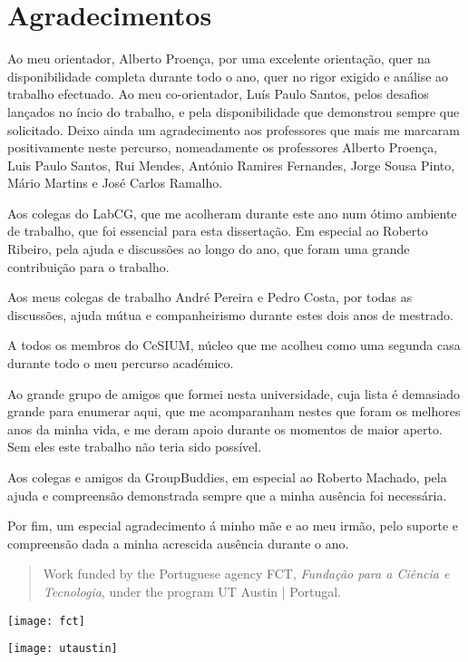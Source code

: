 \documentclass[main.tex]{subfiles}
\begin{document}
\chapter*{Agradecimentos}

Ao meu orientador, Alberto Proença, por uma excelente orientação, quer na disponibilidade completa durante todo o ano, quer no rigor exigido e análise ao trabalho efectuado. Ao meu co-orientador, Luís Paulo Santos, pelos desafios lançados no íncio do trabalho, e pela disponibilidade que demonstrou sempre que solicitado. Deixo ainda um agradecimento aos professores que mais me marcaram positivamente neste percurso, nomeadamente os professores Alberto Proença, Luis Paulo Santos, Rui Mendes, António Ramires Fernandes, Jorge Sousa Pinto, Mário Martins e José Carlos Ramalho.

Aos colegas do LabCG, que me acolheram durante este ano num ótimo ambiente de trabalho, que foi essencial para esta dissertação. Em especial ao Roberto Ribeiro, pela ajuda e discussões ao longo do ano, que foram uma grande contribuição para o trabalho.

Aos meus colegas de trabalho André Pereira e Pedro Costa, por todas as discussões, ajuda mútua e companheirismo durante estes dois anos de mestrado.

A todos os membros do CeSIUM, núcleo que me acolheu como uma segunda casa durante todo o meu percurso académico.

Ao grande grupo de amigos que formei nesta universidade, cuja lista é demasiado grande para enumerar aqui, que me acomparanham nestes que foram os melhores anos da minha vida, e me deram apoio durante os momentos de maior aperto. Sem eles este trabalho não teria sido possível.

Aos colegas e amigos da GroupBuddies, em especial ao Roberto Machado, pela ajuda e compreensão demonstrada sempre que a minha ausência foi necessária.

Por fim, um especial agradecimento á minho mãe e ao meu irmão, pelo suporte e compreensão dada a minha acrescida ausência durante o ano.

\clearpage

\begin{quote}
  Work funded by the Portuguese agency FCT, \textit{Fundação para a Ciência e Tecnologia}, under the program UT Austin | Portugal.
\end{quote}

\begin{center}
  \texttt{[image: fct]}

  \texttt{[image: utaustin]}
\end{center}
\end{document}
